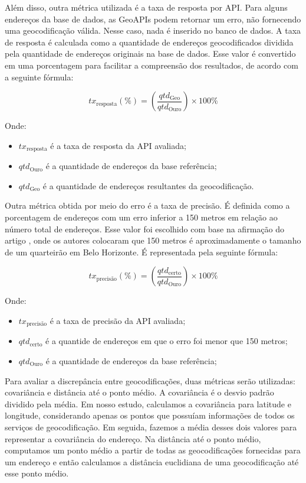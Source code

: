 Além disso, outra métrica utilizada é a taxa de resposta por API. Para alguns endereços da base de dados, as GeoAPIs podem retornar um erro, não fornecendo uma geocodificação válida. Nesse caso, nada é inserido no banco de dados. A taxa de resposta é calculada como a quantidade de endereços geocodificados dividida pela quantidade de endereços originais na base de dados. Esse valor é convertido em uma porcentagem para facilitar a compreensão dos resultados, de acordo com a seguinte fórmula:

\begin{equation}
tx_{\text{resposta}} (\%) = \left(\frac{qtd_{\text{Geo}}}{qtd_{\text{Ouro}}}\right) \times 100\%
\end{equation}

Onde:
\begin{itemize}
    \item $tx_{\text{resposta}}$ é a taxa de resposta da API avaliada;
    \item $qtd_{\text{Ouro}}$ é a quantidade de endereços da base referência;
    \item $qtd_{\text{Geo}}$ é a quantidade de endereços resultantes da geocodificação.
\end{itemize}

Outra métrica obtida por meio do erro é a taxa de precisão. É definida como a porcentagem de endereços com um erro inferior a 150 metros em relação ao número total de endereços. Esse valor foi escolhido com base na afirmação do artigo \cite{Clodoveu2011}, onde os autores colocaram que  150 metros é aproximadamente o tamanho de um quarteirão em Belo Horizonte. É representada pela seguinte fórmula:

\begin{equation}
tx_{\text{precisão}} (\%) = \left(\frac{qtd_{\text{certo}}}{qtd_{\text{Ouro}}}\right) \times 100\%
\end{equation}

 Onde:
 \begin{itemize}
     \item $tx_{\text{precisão}}$ é a taxa de precisão da API avaliada;
     \item $qtd_{\text{certo}}$ é a quantide de endereços em que o erro foi menor que 150 metros;
     \item $qtd_{\text{Ouro}}$ é a quantidade de endereços da base referência;
 \end{itemize}

Para avaliar a discrepância entre geocodificações, duas métricas serão utilizadas: covariância e distância até o ponto médio. A covariância é o desvio padrão dividido pela média. Em nosso estudo, calculamos a covariância para latitude e longitude, considerando apenas os pontos que possuíam informações de todos os serviços de geocodificação. Em seguida, fazemos a média desses dois valores para representar a covariância do endereço. Na distância até o ponto médio, computamos um ponto médio a partir de todas as geocodificações fornecidas para um endereço e então calculamos a distância euclidiana de uma geocodificação até esse ponto médio.

